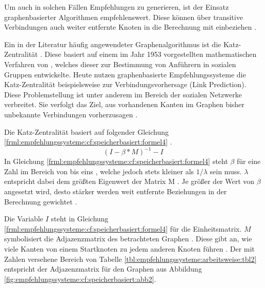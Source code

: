 Um auch in solchen Fällen Empfehlungen zu generieren, ist der Einsatz graphenbasierter Algorithmen empfehlenswert. Diese können über transitive Verbindungen auch weiter entfernte Knoten in die Berechnung mit einbeziehen \cite[S. 60f.]{recommenderSystems:2016}.

Ein in der Literatur häufig angewendeter Graphenalgorithmus ist die Katz-Zentralität \cite[S. 6]{guns:2014}\cite[S. 1f.]{huang:2004}\cite[S. 1ff.]{zhan:2017}. Diese basiert auf einem im Jahr 1953 vorgestellten mathematischen Verfahren von \textcite[S. 1ff.]{katz:1953}, welches dieser zur Bestimmung von Anführern in sozialen Gruppen entwickelte. Heute nutzen graphenbasierte Empfehlungssysteme die Katz-Zentralität beispielsweise zur Verbindungsvorhersage (Link Prediction). Diese Problemstellung ist unter anderem im Bereich der sozialen Netzwerke verbreitet. Sie verfolgt das Ziel, aus vorhandenen Kanten im Graphen bisher unbekannte Verbindungen vorherzusagen \cite[S. 1ff.]{libenNowell:2007}.

Die Katz-Zentralität basiert auf folgender Gleichung \ref{frml:empfehlungssysteme:cf:speicherbasiert:formel4} \cite[S. 4]{libenNowell:2007}.
\begin{equation}
	(I - \beta * M)^{-1} - I
	\label{frml:empfehlungssysteme:cf:speicherbasiert:formel4}
\end{equation}
In Gleichung \ref{frml:empfehlungssysteme:cf:speicherbasiert:formel4} steht $\beta$ für eine Zahl im Bereich von \nullWert bis eins \cite[S. 6]{guns:2014}, welche jedoch stets kleiner als $1/\lambda$ sein muss. $\lambda$ entspricht dabei dem größten Eigenwert der Matrix M \cite[S. 6]{zhan:2017}. Je größer der Wert von $\beta$ angesetzt wird, desto stärker werden weit entfernte Beziehungen in der Berechnung gewichtet \cite[S. 6]{guns:2014}.

Die Variable $I$ steht in Gleichung \ref{frml:empfehlungssysteme:cf:speicherbasiert:formel4} für die Einheitsmatrix. $M$ symbolisiert die Adjazenzmatrix des betrachteten Graphen \cite[S. 4]{libenNowell:2007}. Diese gibt an, wie viele Kanten von einem Startknoten zu jedem anderen Knoten führen \cite[S. 6]{guns:2014}. Der mit Zahlen versehene Bereich von Tabelle \ref{tbl:empfehlungssysteme:arbeitsweise:tbl2} entspricht der Adjazenzmatrix für den Graphen aus Abbildung \ref{fig:empfehlungssysteme:cf:speicherbasiert:abb2}.

